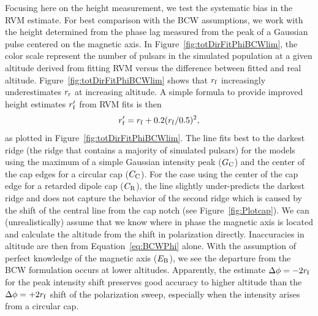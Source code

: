 	Focusing here on the height measurement, we test the systematic bias in
the RVM estimate. For best comparison with the BCW assumptions, we work with
the height determined from the phase lag measured from the peak of a Gaussian pulse
centered on the magnetic axis. In Figure~\ref{fig:totDirFitPhiBCWlim}, the color scale
represent the number of pulsars in the simulated population
at a given altitude derived from fitting RVM versus the difference between fitted and
real altitude. Figure~\ref{fig:totDirFitPhiBCWlim} shows that $r_{\rm{f}}$ increasingly underestimates
$r_{\rm{r}}$ at increasing altitude. A simple formula to provide improved height estimates 
$r_{\rm{f}}'$ from RVM fits is then
\begin{equation}\label{eq:genCor}
r_{\rm f}' = r_{\rm f}+ 0.2 (r_{\rm f}/0.5)^2,
\end{equation}
as plotted in Figure~\ref{fig:totDirFitPhiBCWlim}.  The line fits best to the darkest 
ridge (the ridge that contains a majority of simulated pulsars) 
for the models using the maximum of a simple Gaussian intensity peak ($G_{\rm{C}}$)
and the center of the cap edges for a circular cap ($C_{\rm{C}}$).  For the case using
the center of the cap edge for a retarded dipole cap ($C_{\rm{R}}$), the line
slightly under-predicts the 
darkest ridge and does not capture the behavior of the 
second ridge which is caused by the shift of the central line from the cap notch
(see Figure~\ref{fig:Plotcap}).  We can (unrealistically) assume that 
we know where in phase the magnetic axis 
is located and calculate the altitude from the shift in polarization directly.  Inaccuracies 
in altitude are then from Equation~\ref{eq:BCWPhi} alone.  
With the assumption of perfect knowledge of 
the magnetic axis ($E_{\rm{B}}$), we see the departure from the BCW formulation occurs 
at lower altitudes.  Apparently, the estimate $\Delta \phi=-2r_{\rm{f}}$ 
for the peak intensity shift preserves good accuracy to higher altitude 
than the $\Delta \phi=+2r_{\rm{f}}$ shift of the polarization
sweep, especially when the intensity arises from a circular cap.

